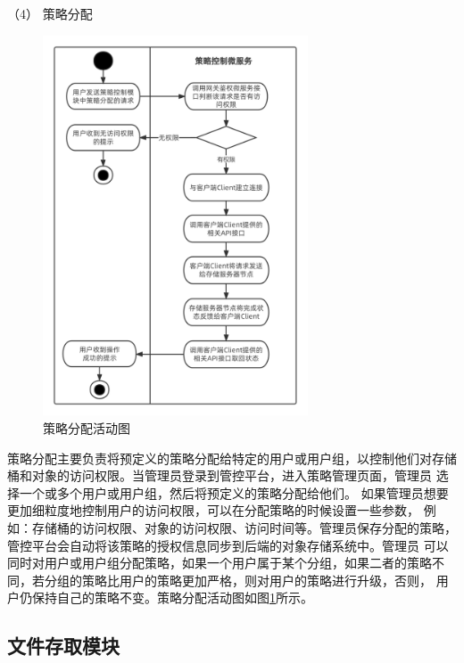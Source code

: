 （4） 策略分配
\begin{figure}[h]
    \centering
    \includegraphics[width=0.7\textwidth]{my_figures/chapter4/策略分配活动图.png}
    \caption{策略分配活动图}
    \label{fig:策略分配活动图}
\end{figure}



策略分配主要负责将预定义的策略分配给特定的用户或用户组，以控制他们对存储桶和对象的访问权限。当管理员登录到管控平台，进入策略管理页面，管理员
选择一个或多个用户或用户组，然后将预定义的策略分配给他们。
如果管理员想要更加细粒度地控制用户的访问权限，可以在分配策略的时候设置一些参数，
例如：存储桶的访问权限、对象的访问权限、访问时间等。管理员保存分配的策略，管控平台会自动将该策略的授权信息同步到后端的对象存储系统中。管理员
可以同时对用户或用户组分配策略，如果一个用户属于某个分组，如果二者的策略不同，若分组的策略比用户的策略更加严格，则对用户的策略进行升级，否则，
用户仍保持自己的策略不变。策略分配活动图如图\ref{fig:策略分配活动图}所示。



\subsection{文件存取模块}


